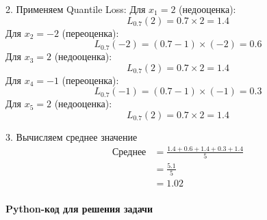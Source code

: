 \documentclass[12pt]{article}
\theoremstyle{definition}
\theoremstyle{definition}
\theoremstyle{definition}
\theoremstyle{remark}
\theoremstyle{remark}
\begin{document}
2. Применяем Quantile Loss:
Для $x_1 = 2$ (недооценка):
\[
L_{0.7}(2) = 0.7 \times 2 = 1.4
\]
Для $x_2 = -2$ (переоценка):
\[
L_{0.7}(-2) = (0.7 - 1) \times (-2) = 0.6
\]
Для $x_3 = 2$ (недооценка):
\[
L_{0.7}(2) = 0.7 \times 2 = 1.4
\]
Для $x_4 = -1$ (переоценка):
\[
L_{0.7}(-1) = (0.7 - 1) \times (-1) = 0.3
\]
Для $x_5 = 2$ (недооценка):
\[
L_{0.7}(2) = 0.7 \times 2 = 1.4
\]

3. Вычисляем среднее значение
\[
\begin{aligned}
\text{Среднее} &= \frac{1.4 + 0.6 + 1.4 + 0.3 + 1.4}{5} \\
&= \frac{5.1}{5} \\
&= 1.02
\end{aligned}
\]

\paragraph*{Python-код для решения задачи}
\end{document}
